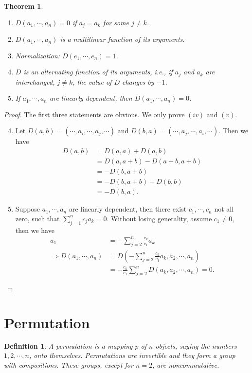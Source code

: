 \documentclass[11pt]{book}
\newtheorem{definition}{Definition}[section]
\newtheorem{theorem}{Theorem}[section]
\theoremstyle{definition}
\numberwithin{equation}{subsection}
\begin{document}
\begin{theorem}\label{determinant}
~\begin{enumerate}[label=(\roman*)]
    \item $D(a_1,\cdots,a_n) = 0$ if $a_j = a_k$ for some $j\neq k$.
    \item $D(a_1,\cdots,a_n)$ is a multilinear function of its arguments.
    \item Normalization: $D(e_1,\cdots,e_n) = 1$.
    \item $D$ is an alternating function of its arguments, i.e., if $a_j$ and $a_k$ are interchanged, $j\neq k$, the value of $D$ changes by $-1$.
    \item If $a_1,\cdots,a_n$ are linearly dependent, then $D(a_1,\cdots,a_n) = 0$.
\end{enumerate}
\end{theorem}
\begin{proof}
The first three statements are obvious. We only prove $(iv)$ and $(v)$.
\begin{enumerate}[label=(\roman*)]
    \setcounter{enumi}{3}
    \item Let $D(a,b) = (\cdots,a_i,\cdots,a_j,\cdots)$ and $D(b,a) = (\cdots,a_j,\cdots,a_i,\cdots)$. Then we have
    \begin{align*}
        D(a,b) & = D(a,a) + D(a,b) \\
        & = D(a,a+b) - D(a+b, a+b) \\
        & = - D(b, a+b) \\
        & = - D(b, a+b) + D(b,b)\\
        & = -D(b,a).
    \end{align*}
    \item Suppose $a_1,\cdots,a_n$ are linearly dependent, then there exist $c_1,\cdots,c_n$ not all zero, such that $\sum^n_{j=1}c_j a_k = 0$. Without losing generality, assume $c_1\neq 0$, then we have
    \begin{align*}
        a_1 & = -\sum^n_{j=2}\frac{c_k}{c_1}a_k \\
        \Rightarrow D(a_1,\cdots,a_n) & = D\left(-\sum^n_{j=2}\frac{c_k}{c_1}a_k, a_2,\cdots,a_n\right) \\
        & = -\frac{c_k}{c_1} \sum^n_{j=2} D(a_k, a_2, \cdots, a_n) = 0.
    \end{align*}
\end{enumerate}
\end{proof}

\medskip

\section{Permutation}
\begin{definition}
A permutation is a mapping $p$ of $n$ objects, saying the numbers $1,2,\cdots,n$, onto themselves. Permutations are invertible
and they form a group with compositions. These groups, except for $n = 2$, are noncommutative.
\end{definition}
\end{document}
